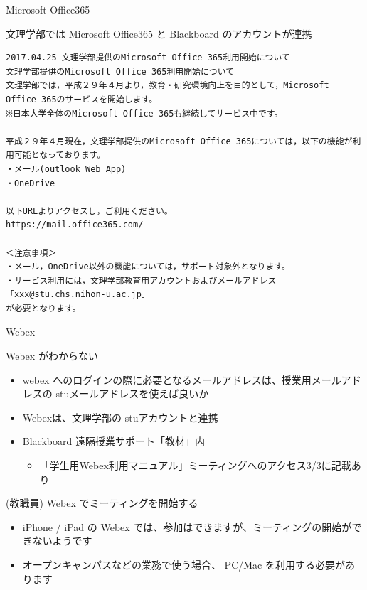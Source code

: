 \documentclass[a4j,10pt]{jsarticle}
\def\lthtmlcheckvsize{\ifdim\ht\sizebox<\vsize 
  \ifdim\wd\sizebox<\hsize\expandafter\hfill\fi \expandafter\vfill
  \else\expandafter\vss\fi}%
\begin{document}
{\begin{frame}[label={sec:org712dbc5},fragile]{Microsoft Office365}
\begin{block}{文理学部では Microsoft Office365 と Blackboard のアカウントが連携}
\begin{verbatim}
2017.04.25 文理学部提供のMicrosoft Office 365利用開始について
文理学部提供のMicrosoft Office 365利用開始について
文理学部では，平成２９年４月より，教育・研究環境向上を目的として，Microsoft Office 365のサービスを開始します。
※日本大学全体のMicrosoft Office 365も継続してサービス中です。

平成２９年４月現在，文理学部提供のMicrosoft Office 365については，以下の機能が利用可能となっております。
・メール(outlook Web App)
・OneDrive

以下URLよりアクセスし，ご利用ください。
https://mail.office365.com/

＜注意事項＞
・メール，OneDrive以外の機能については，サポート対象外となります。
・サービス利用には，文理学部教育用アカウントおよびメールアドレス
「xxx@stu.chs.nihon-u.ac.jp」
が必要となります。\end{verbatim}

\end{block}
\end{frame}%
\lthtmlfigureZ
\lthtmlcheckvsize\clearpage}

{\newpage\clearpage
{}%
\begin{frame}[label={sec:org7ec218b},fragile]{Webex}
\begin{block}{Webex がわからない}
\begin{itemize}
\item webex へのログインの際に必要となるメールアドレスは、授業用メールアドレスの stuメールアドレスを使えば良いか
\par
\item Webexは、文理学部の stuアカウントと連携
\item Blackboard 遠隔授業サポート「教材」内
\begin{itemize}
\item 「学生用Webex利用マニュアル」ミーティングへのアクセス3/3に記載あり
\end{itemize}
\end{itemize}
\end{block}
\par
\begin{block}{(教職員) Webex でミーティングを開始する}
\begin{itemize}
\item iPhone / iPad の Webex では、参加はできますが、ミーティングの開始ができないようです
\item オープンキャンパスなどの業務で使う場合、 PC/Mac を利用する必要があります
\end{itemize}
\end{block}
\end{frame}%
\lthtmlfigureZ
\lthtmlcheckvsize\clearpage}
\end{document}
